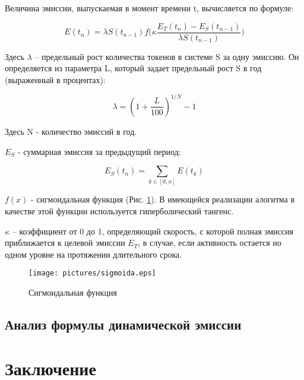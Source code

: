 \documentclass[a4paper,12pt]{article}
\begin{document}
Величина эмиссии, выпускаемая в момент времени t, вычисляется по формуле:

$$
    E(t_n) = \lambda S(t_{n-1}) f \Big( \kappa \frac {E_T(t_n) - E_S(t_{n-1})}{\lambda S(t_{n-1})} \Big)
$$

Здесь $\lambda$ -- предельный рост количества токенов в системе S за одну эмиссию. Он определяется из параметра L, который задает предельный рост S в год (выраженный в процентах):

$$
    \lambda = (1 + \frac{L}{100})^{1/N}-1
$$

Здесь N - количество эмиссий в год.

$E_S$ - суммарная эмиссия за предыдущий период:

$$
    E_S(t_n) = \sum_{k \in [0, n]}{E(t_k)}
$$

$f(x)$ - сигмоидальная функция (Рис. \ref{fig:sigmoida}). В имеющейся реализации алогитма в качестве этой функции используется гиперболический тангенс.

$\kappa$ -- коэффициент от 0 до 1, определяющий скорость, с которой полная эмиссия приближается к целевой эмиссии $E_T$, в случае, если активность остается но одном уровне на протяжении длительного срока.

\begin{figure}[h]
      \texttt{[image: pictures/sigmoida.eps]}
      \caption{Сигмоидальная функция}
      \label{fig:sigmoida}
\end{figure}

\subsection{Анализ формулы динамической эмиссии}






\section{Заключение}
\end{document}
